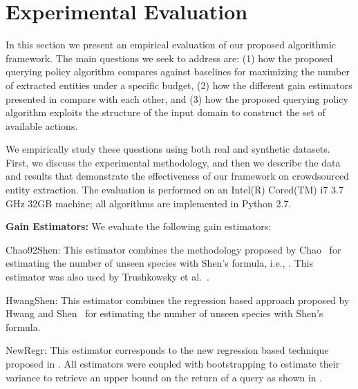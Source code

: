 

\section{Experimental Evaluation}
\label{sec:exps}
In this section we present an empirical evaluation of our proposed algorithmic framework. The main questions we seek to address are: (1) how the proposed querying policy algorithm compares against baselines for maximizing the number of extracted entities under a specific budget, (2) how the different gain estimators presented in  compare with each other, and (3) how the proposed querying policy algorithm exploits the structure of the input domain to construct the set of available actions.

We empirically study these questions using both real and synthetic datasets. First, we discuss the experimental methodology, and then we describe the data and results that demonstrate the effectiveness of our framework on crowdsourced entity extraction. The evaluation is performed on an Intel(R) Cored(TM) i7 3.7 GHz 32GB machine; all algorithms are implemented in Python 2.7. 

\vspace{5pt}\noindent\textbf{Gain Estimators:} We evaluate the following gain estimators:
\squishlist
\item Chao92Shen: This estimator combines the methodology proposed by Chao~\cite{chao:1992} for estimating the number of unseen species  with Shen's formula, i.e., . This estimator was also used by Trushkowsky et al.~\cite{trushkowsky:2013}.
\item HwangShen: This estimator combines the regression based approach proposed by Hwang and Shen~\cite{hwang:2010} for estimating the number of unseen species with Shen's formula. 
\item NewRegr: This estimator corresponds to the new regression based technique proposed in .
\squishend
All estimators were coupled with bootstrapping to estimate their variance to retrieve an upper bound on the return of a query as shown in .


